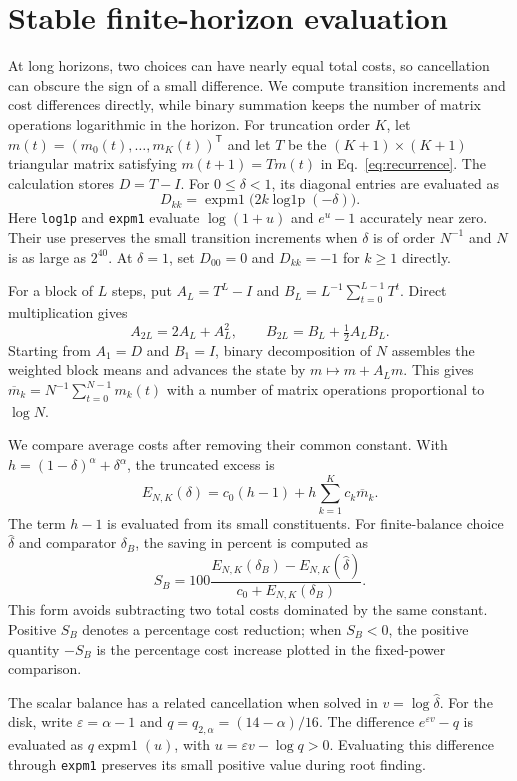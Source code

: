 \documentclass[11pt,a4paper]{article}
\begin{document}
\section{Stable finite-horizon evaluation}
At long horizons, two choices can have nearly equal total costs, so cancellation can obscure the sign of a small difference. We compute transition increments and cost differences directly, while binary summation keeps the number of matrix operations logarithmic in the horizon. For truncation order $K$, let $m(t)=(m_0(t),\ldots,m_K(t))^\mathsf{T}$ and let $T$ be the $(K+1)\times(K+1)$ triangular matrix satisfying $m(t+1)=Tm(t)$ in Eq.~\eqref{eq:recurrence}. The calculation stores $D=T-I$. For $0\leq\delta<1$, its diagonal entries are evaluated as
\[
D_{kk}=\operatorname{expm1}\bigl(2k\operatorname{log1p}(-\delta)\bigr).
\]
Here \texttt{log1p} and \texttt{expm1} evaluate $\log(1+u)$ and $e^u-1$ accurately near zero. Their use preserves the small transition increments when $\delta$ is of order $N^{-1}$ and $N$ is as large as $2^{40}$. At $\delta=1$, set $D_{00}=0$ and $D_{kk}=-1$ for $k\geq1$ directly.

For a block of $L$ steps, put $A_L=T^L-I$ and $B_L=L^{-1}\sum_{t=0}^{L-1}T^t$. Direct multiplication gives
\[
A_{2L}=2A_L+A_L^2,\qquad B_{2L}=B_L+\tfrac12 A_LB_L.
\]
Starting from $A_1=D$ and $B_1=I$, binary decomposition of $N$ assembles the weighted block means and advances the state by $m\mapsto m+A_Lm$. This gives $\overline m_k=N^{-1}\sum_{t=0}^{N-1}m_k(t)$ with a number of matrix operations proportional to $\log N$.

We compare average costs after removing their common constant. With $h=(1-\delta)^\alpha+\delta^\alpha$, the truncated excess is
\[
E_{N,K}(\delta)=c_0(h-1)+h\sum_{k=1}^{K}c_k\overline m_k.
\]
The term $h-1$ is evaluated from its small constituents. For finite-balance choice $\widehat\delta$ and comparator $\delta_B$, the saving in percent is computed as
\[
S_B=100\frac{E_{N,K}(\delta_B)-E_{N,K}(\widehat\delta)}{c_0+E_{N,K}(\delta_B)}.
\]
This form avoids subtracting two total costs dominated by the same constant. Positive $S_B$ denotes a percentage cost reduction; when $S_B<0$, the positive quantity $-S_B$ is the percentage cost increase plotted in the fixed-power comparison.

The scalar balance has a related cancellation when solved in $v=\log\widehat\delta$. For the disk, write $\varepsilon=\alpha-1$ and $q=q_{2,\alpha}=(14-\alpha)/16$. The difference $e^{\varepsilon v}-q$ is evaluated as $q\operatorname{expm1}(u)$, with $u=\varepsilon v-\log q>0$. Evaluating this difference through \texttt{expm1} preserves its small positive value during root finding.
\end{document}
